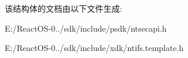该结构体的文档由以下文件生成\+:\begin{DoxyCompactItemize}
\item 
E\+:/\+React\+O\+S-\/0../sdk/include/psdk/ntsecapi.\+h\item 
E\+:/\+React\+O\+S-\/0../sdk/include/xdk/ntifs.\+template.\+h\end{DoxyCompactItemize}
